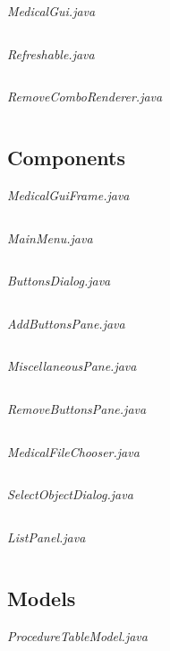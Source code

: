 \documentclass{article}
\begin{document}
\textit{MedicalGui.java}\label{MedicalGui.java}
\inputminted{java}{./src/main/java/com/yvesstraten/medicalconsolegui/MedicalGui.java}

\textit{Refreshable.java}
\inputminted{java}{./src/main/java/com/yvesstraten/medicalconsolegui/Refreshable.java}

\textit{RemoveComboRenderer.java}
\inputminted{java}{./src/main/java/com/yvesstraten/medicalconsolegui/RemoveComboRenderer.java}

\subsection{Components}\label{subsec:components} %
\textit{MedicalGuiFrame.java}
\inputminted{java}{./src/main/java/com/yvesstraten/medicalconsolegui/components/MedicalGuiFrame.java}

\textit{MainMenu.java}
\inputminted{java}{./src/main/java/com/yvesstraten/medicalconsolegui/components/MainMenu.java}

\textit{ButtonsDialog.java}
\inputminted{java}{./src/main/java/com/yvesstraten/medicalconsolegui/components/ButtonsDialog.java}

\textit{AddButtonsPane.java}
\inputminted{java}{./src/main/java/com/yvesstraten/medicalconsolegui/components/AddButtonsPane.java}

\textit{MiscellaneousPane.java}
\inputminted{java}{./src/main/java/com/yvesstraten/medicalconsolegui/components/MiscellaneousPane.java}

\textit{RemoveButtonsPane.java}
\inputminted{java}{./src/main/java/com/yvesstraten/medicalconsolegui/components/RemoveButtonsPane.java}

\textit{MedicalFileChooser.java}
\inputminted{java}{./src/main/java/com/yvesstraten/medicalconsolegui/components/MedicalFileChooser.java}

\textit{SelectObjectDialog.java}
\inputminted{java}{./src/main/java/com/yvesstraten/medicalconsolegui/components/SelectObjectDialog.java}

\textit{ListPanel.java}
\inputminted{java}{./src/main/java/com/yvesstraten/medicalconsolegui/components/ListPanel.java}

\subsection{Models}\label{sec:models} %
\textit{ProcedureTableModel.java}
\inputminted{java}{./src/main/java/com/yvesstraten/medicalconsolegui/models/ProcedureTableModel.java}
\end{document}
